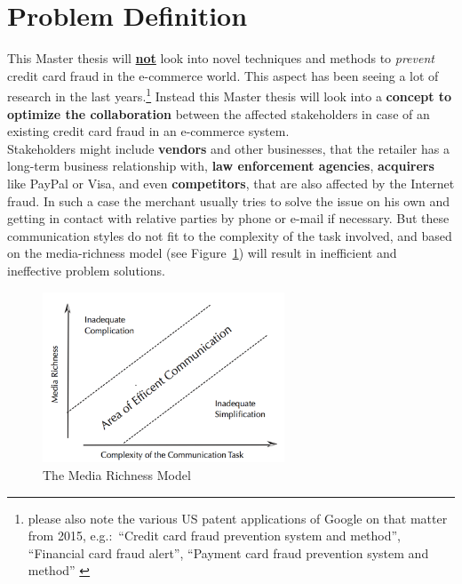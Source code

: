 
\section{Problem Definition}
\label{sec:problem_definition}

This Master thesis will \textbf{\underline{not}} look into novel techniques and methods to \textit{prevent} credit card fraud in the e-commerce world. This aspect has been seeing a lot of research
in the last years.\footnote{please also note the various US patent applications of Google on that matter from 2015, e.g.:\ “Credit card fraud prevention system and method”, “Financial card fraud alert”,
“Payment card fraud prevention system and method” \citep{GooglePatents2015}} Instead this Master thesis will look into a \textbf{concept to optimize the collaboration} between the affected stakeholders in case of an existing credit card fraud in an e-commerce system. \\

Stakeholders might include \textbf{vendors} and other businesses, that the retailer has a long-term business relationship with, \textbf{law enforcement agencies}, \textbf{acquirers} like PayPal or Visa,
and even \textbf{competitors}, that are also affected by the Internet fraud. In such a case the merchant usually tries to solve the issue on his own and getting in contact with relative parties by phone or e-mail
if necessary. But these communication styles do not fit to the complexity of the task involved, and based on the media-richness model (see Figure~\ref{fig:images_media_richness_model}) will result in inefficient and ineffective problem solutions. \\

\begin{figure}[!ht]
	\centering
		\includegraphics[height=2in]{images/media-richness-model.png}
	\caption{The Media Richness Model \citep{Rice1992}}
\label{fig:images_media_richness_model}
\end{figure}

